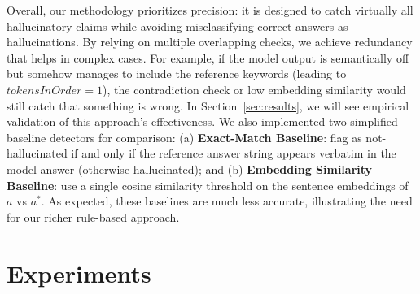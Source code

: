 \documentclass{article}
\begin{document}
Overall, our methodology prioritizes precision: it is designed to catch virtually all hallucinatory claims while avoiding misclassifying correct answers as hallucinations. By relying on multiple overlapping checks, we achieve redundancy that helps in complex cases. For example, if the model output is semantically off but somehow manages to include the reference keywords (leading to $\mathit{tokensInOrder}=1$), the contradiction check or low embedding similarity would still catch that something is wrong. In Section~\ref{sec:results}, we will see empirical validation of this approach’s effectiveness. We also implemented two simplified baseline detectors for comparison: (a) \textbf{Exact-Match Baseline}: flag as not-hallucinated if and only if the reference answer string appears verbatim in the model answer (otherwise hallucinated); and (b) \textbf{Embedding Similarity Baseline}: use a single cosine similarity threshold on the sentence embeddings of $a$ vs $a^*$. As expected, these baselines are much less accurate, illustrating the need for our richer rule-based approach.

\section{Experiments}\label{sec:experiments}
\end{document}
